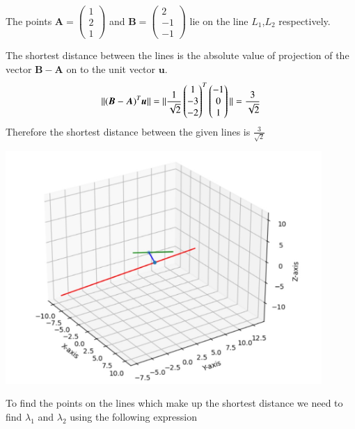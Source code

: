 \documentclass[journal,12pt,twocolumn]{IEEEtran}
\newcommand{\norm}[1]{\| #1 \|}
\begin{document}
The points $\bm{A}=\begin{pmatrix}1\\2\\1\end{pmatrix}$ and $\bm{B}=\begin{pmatrix}2\\-1\\-1\end{pmatrix}$ lie on the line $L_1$,$L_2$ respectively.\par
The shortest distance between the lines is the absolute value of projection of the vector $\bm{B}-\bm{A}$ on to the unit vector $\bm{u}$.
\begin{equation}
    \norm{(\bm{B}-\bm{A})^T\bm{u}}\\
    =\norm{\frac{1}{\sqrt{2}}\begin{pmatrix}1\\-3\\-2\end{pmatrix}^T\begin{pmatrix}-1\\0\\1\end{pmatrix}}\\
    =\frac{3}{\sqrt{2}}\notag
\end{equation}
Therefore the shortest distance between the given lines is $\frac{3}{\sqrt{2}}$
\begin{center}
    \includegraphics[width=12cm]{assignment2.jpg}
\end{center}
To find the points on the lines which make up the shortest distance we need to find $\lambda_1$ and $\lambda_2$ using the following expression\\
\end{document}
